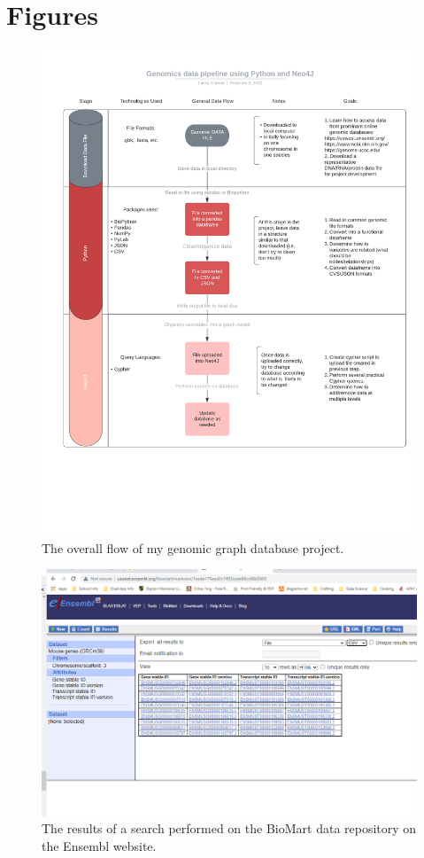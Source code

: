 \documentclass[]{article}
\begin{document}
\section{Figures}
\begin{figure}[!h]
	\includegraphics[scale=0.70]{data_pipeline}
	\caption{The overall flow of my genomic graph database project.}
	\label{Fig:Race}
\end{figure}

\begin{figure}[!h]
	\includegraphics[scale=0.50]{ensemb}
	\caption{The results of a search performed on the BioMart data repository on the Ensembl website.}
	\label{Fig:Race}
\end{figure}
\end{document}
